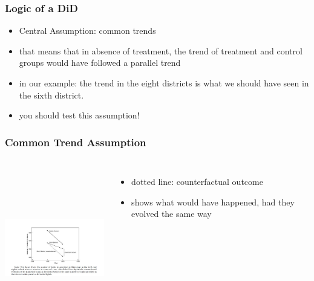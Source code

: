 \documentclass{beamer}
\begin{document}
\begin{frame}
\frametitle{Logic of a DiD}
\begin{itemize}
	\item Central Assumption: common trends
	\item that means that in absence of treatment, the trend of treatment and control groups would have followed a parallel trend
	\item in our example: the trend in the eight districts is what we should have seen in the sixth district. 
	\item you should test this assumption!
	
\end{itemize}

\end{frame}
\begin{frame}
\frametitle{Common Trend Assumption}

 \begin{columns}
\includegraphics[width=6cm,height=7cm,keepaspectratio]{Figure 5.1} 

\begin{itemize}
	\item dotted line: counterfactual outcome 
	\item shows what would have happened, had they evolved the same way

\end{itemize}

\end{columns}

\end{frame}
\end{document}
